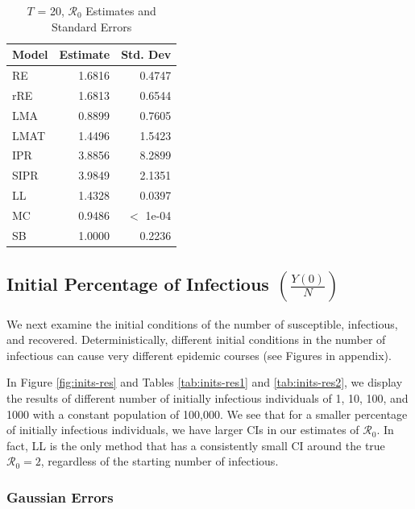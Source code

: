 \documentclass[12pt]{article}
\newcommand{\rr}{\ensuremath{\mathcal{R}_0}}
\begin{document}
\begin{table}[H]
	\centering
	\begin{tabular}[t]{l|r|r}
		\hline
		Model & Estimate & Std. Dev\\
		\hline
		RE & 1.6816 & 0.4747\\
		\hline
		rRE & 1.6813 & 0.6544\\
		\hline
		LMA & 0.8899 & 0.7605\\
		\hline
		LMAT & 1.4496 & 1.5423\\
		\hline
		IPR & 3.8856 & 8.2899\\
		\hline
		SIPR & 3.9849 & 2.1351\\
		\hline
		LL & 1.4328 & 0.0397\\
		\hline
		MC & 0.9486 & $<$ 1e-04\\
		\hline
		SB & 1.0000 & 0.2236\\
		\hline
	\end{tabular}
	\caption{$T$ = 20, $\rr$ Estimates and Standard Errors}
\end{table}


\subsection{Initial Percentage of Infectious $\left (\frac{Y(0)}{N}\right)$}\label{sec:res-inf}
We next examine the initial conditions of the number of susceptible, infectious, and recovered.  Deterministically, different initial conditions in the number of infectious can cause very different epidemic courses (see Figures in appendix).

In Figure \ref{fig:inits-res} and Tables \ref{tab:inits-res1} and \ref{tab:inits-res2}, we display the results of different number of initially infectious individuals of 1, 10, 100, and 1000 with a constant population of 100,000.  We see that for a smaller percentage of initially infectious individuals, we have larger CIs in our estimates of $\rr$.  In fact, LL is the only method that has a consistently small CI around the true $\rr=2$, regardless of the starting number of infectious.

\subsubsection{Gaussian Errors}
\end{document}
